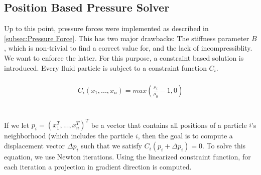 \documentclass{ACGSeminar}
\begin{document}
\subsection{Position Based Pressure Solver}

Up to this point, pressure forces were implemented as described in \ref{subsec:Pressure Force}. This has two major drawbacks: The stiffness parameter \(B\), which is non-trivial to find a correct value for, and the lack of incompressiblity. We want to enforce the latter.
For this purpose, a constraint based solution is introduced. Every fluid particle is subject to a constraint function \(C_{i}\).\\
\\
\begin{equation} 
\begin{aligned}
C_{i}(x_{1}, ..., x_{n}) = max (\frac{\rho_{i}}{\rho_{0}} - 1, 0)
\end{aligned}
\end{equation}\\
\\

If we let \(p_i = (x^{T}_1, ..., x^{T}_n)^T\) be a vector that contains all positions of a particle \(i\)'s neighborhood (which includes the particle \(i\), then the goal is to compute a displacement vector \(\Delta p_i\) such that we satisfy \(C_i(p_i + \Delta p_i) = 0\).
To solve this equation, we use Newton iterations. Using the linearized constraint function, for each iteration a projection in gradient direction is computed.
\end{document}
